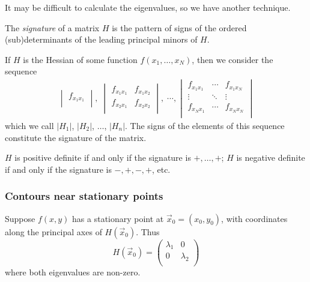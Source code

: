 \documentclass{../template/note}
\begin{document}
    It may be difficult to calculate the eigenvalues, so we have another technique.

    \begin{definition}
        The \emph{signature} of a matrix \(H\) is the pattern of signs of the ordered (sub)determinants of the leading principal minors of \(H\).
    \end{definition}
    
    \begin{example}
        If \(H\) is the Hessian of some function \(f(x_1, \dots, x_N)\), then we consider the sequence
        \begin{align*}
            \begin{vmatrix}
             f_{x_1x_1} \\
            \end{vmatrix}, \; \begin{vmatrix}
             f_{x_1x_1} & f_{x_1x_2} \\
             f_{x_2x_1} & f_{x_2x_2} \\
            \end{vmatrix}, \; \cdots, \begin{vmatrix}
             f_{x_1x_1} & \cdots & f_{x_1x_N} \\
             \vdots & \ddots & \vdots \\
             f_{x_Nx_1} & \cdots & f_{x_Nx_N} \\
            \end{vmatrix}
        \end{align*}
        which we call \(|H_1|\), \(|H_2|\), \(\dots\), \(|H_n|\). The signs of the elements of this sequence constitute the signature of the matrix.        
    \end{example}
    
    \begin{theorem}
        \(H\) is positive definite if and only if the signature is \(+, \dots, +\); \(H\) is negative definite if and only if the signature is \(-, +, -, +\), etc.
    \end{theorem}
    
    \subsubsection{Contours near stationary points}

    Suppose \(f(x, y)\) has a stationary point at \(\vec x_0 = (x_0, y_0)\), with coordinates along the principal axes of \(H(\vec x_0)\). Thus
    \[
        H(\vec x_0) = \begin{pmatrix}
         \lambda_1 & 0 \\
         0 & \lambda_2 \\
        \end{pmatrix}
    \]
    where both eigenvalues are non-zero.
\end{document}
